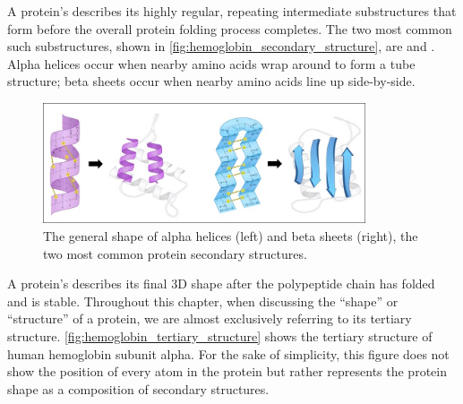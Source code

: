 A protein's  describes its highly regular, repeating intermediate substructures that form before the overall protein folding process completes. The two most common such substructures, shown in \autoref{fig:hemoglobin_secondary_structure}, are  and . Alpha helices occur when nearby amino acids wrap around to form a tube structure; beta sheets occur when nearby amino acids line up side-by-side.\\

\begin{figure}[h]
	\centering
	\mySfFamily
	\includegraphics[width = 0.85\textwidth]{../images/hemoglobin_secondary_structure.png}
	\caption{The general shape of alpha helices (left) and beta sheets (right), the two most common protein secondary structures.}
	\label{fig:hemoglobin_secondary_structure}
\end{figure}

A protein's  describes its final 3D shape after the polypeptide chain has folded and is stable. Throughout this chapter, when discussing the ``shape'' or ``structure'' of a protein, we are almost exclusively referring to its tertiary structure. \autoref{fig:hemoglobin_tertiary_structure} shows the tertiary structure of human hemoglobin subunit alpha. For the sake of simplicity, this figure does not show the position of every atom in the protein but rather represents the protein shape as a composition of secondary structures.

